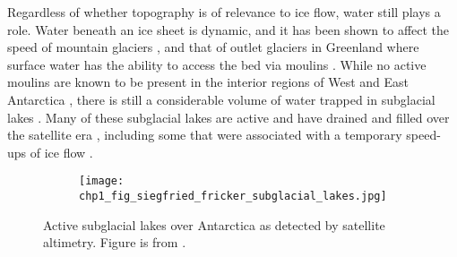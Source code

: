 Regardless of whether topography is of relevance to ice flow, water still plays a role.
Water beneath an ice sheet is dynamic, and it has been shown to affect the speed of mountain glaciers \citep{IkenUpliftUnteraargletscherBeginning1983}, and that of outlet glaciers in Greenland where surface water has the ability to access the bed via moulins \citep{ZwallySurfaceMeltInducedAcceleration2002}.
While no active moulins are known to be present in the interior regions of West and East Antarctica \citep{DirscherlAutomatedMappingAntarctic2020,StokesWidespreaddistributionsupraglacial2019}, there is still a considerable volume of water trapped in subglacial lakes \citep{WrightfourthinventoryAntarctic2012}.
Many of these subglacial lakes are active and have drained and filled over the satellite era \citep[Fig.~\ref{fig:1.4}][]{Smithinventoryactivesubglacial2009,SiegfriedThirteenyearssubglacial2018}, including some that were associated with a temporary speed-ups of ice flow \citep[e.g.][]{Scambostriggeringsubglaciallake2011,BellLargesubglaciallakes2007,StearnsIncreasedflowspeed2008,WrightSubglacialhydrologicalconnectivity2014}.

\begin{figure}[htbp]
  \centering
  \begin{subfigure}[t]{0.8\textwidth}
    \texttt{[image: chp1\_fig\_siegfried\_fricker\_subglacial\_lakes.jpg]}
    \label{fig:1.4a}
  \end{subfigure}
  \caption[Map of satellite-detected active subglacial lakes in Antarctica]{
    Active subglacial lakes over Antarctica as detected by satellite altimetry.
    Figure is from \citet{SiegfriedThirteenyearssubglacial2018}.
  }
  \label{fig:1.4}
\end{figure}


